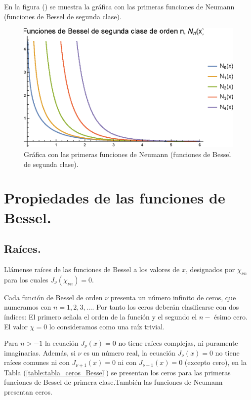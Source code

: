 En la figura () se muestra la gráfica con las primeras funciones de Neumann (funciones de Bessel de segunda clase).
\begin{figure}[H]
    \centering
    \includegraphics[scale=1]{Imagenes/Plot_Bessel_02_Neumann.eps}
    \caption{Gráfica con las primeras funciones de Neumann (funciones de Bessel de segunda clase).}
    \label{fig:figura_plot_Neumann}
\end{figure}


\section{Propiedades de las funciones de Bessel.}
\subsection{Raíces.}

Llámense raíces de las funciones de Bessel a los valores de $x$, designados por $\chi_{\nu n}$ para los cuales $J_{\nu} (\chi_{\nu n}) = 0$. 
\par
Cada función de Bessel de orden $\nu$ presenta un número infinito de ceros, que numeramos con $n = 1, 2, 3, \ldots$. Por tanto los ceros deberán clasificarse con dos índices: El primero señala el orden de la función y el segundo el $n-$ ésimo cero. El valor $\chi = 0$ lo consideramos como una raíz trivial.
\par
Para $n > -1$ la ecuación $J_{\nu} (x) = 0$ no tiene raíces complejas, ni puramente imaginarias. Además, si $\nu$ es un número real, la ecuación $J_{\nu} (x) = 0$ no tiene raíces comunes ni con $J_{\nu+1} (x) = 0$ ni con $J_{\nu-1} (x) = 0$ (excepto cero), en la Tabla (\ref{table:tabla_ceros_Bessel}) se presentan los ceros para las primeras funciones de Bessel de primera clase.También las funciones de Neumann presentan ceros.


